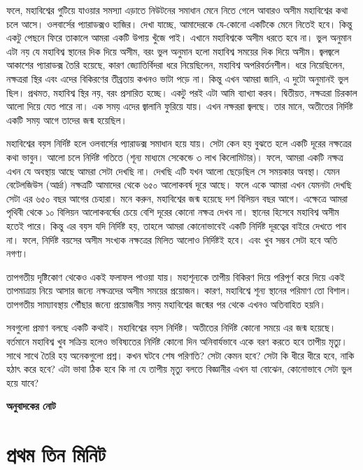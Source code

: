 \documentclass[
]{book}
\begin{document}
ফলে, মহাবিশ্বের গুটিয়ে যাওয়ার সমস্যা এড়াতে নিউটনের সমাধান মেনে নিতে গেলে আবারও অসীম মহাবিশ্বের কথা চলে আসে। ওলবার্সের প্যারাডক্সও হাজির। দেখা যাচ্ছে, আমাদেরকে যে-কোনো একটিকে মেনে নিতেই হবে। কিন্তু একটু পেছনে ফিরে তাকালে আমরা একটি উপায় খুঁজে পাই। এখানে মহাবিশ্বকে অসীম ধরতে হবে না। ভুল অনুমান এটা নয় যে মহাবিশ্ব স্থানের দিক দিয়ে অসীম, বরং ভুল অনুমান হলো মহাবিশ্ব সময়ের দিক দিয়ে অসীম। জ্বলজ্বলে আকাশের প্যারাডক্স তৈরি হয়েছে, কারণ জ্যোতির্বিদরা ধরে নিয়েছিলেন, মহাবিশ্ব অপরিবর্তনশীল। ধরে নিয়েছিলেন, নক্ষত্ররা স্থির এবং এদের বিকিরণের তীব্রতায় কখনও ভাটা পড়ে না। কিন্তু এখন আমরা জানি, এ দুটো অনুমানই ভুল ছিল। প্রথমত, মহাবিশ্ব স্থির নয়, বরং প্রসারিত হচ্ছে। একটু পরই এটা আমি ব্যাখ্যা করব। দ্বিতীয়ত, নক্ষত্ররা চিরকাল আলো দিয়ে যেত পারে না। এক সময় এদের জ্বালানি ফুরিয়ে যায়। এখন নক্ষররা জ্বলছে। তার মানে, অতীতের নির্দিষ্ট একটি সময় আগে তাদের জন্ম হয়েছিল।

মহাবিশ্বের বয়স নির্দিষ্ট হলে ওলবার্সের প্যারাডক্স সমাধান হয়ে যায়। সেটা কেন হয় বুঝতে হলে একটি দূরের নক্ষত্রের কথা ভাবুন। আলো চলে নির্দিষ্ট গতিতে (শূন্য মাধ্যমে সেকেন্ডে ৩ লাখ কিলোমিটার)। ফলে, আমরা একটি নক্ষত্র এখন যে অবস্থায় আছে আমরা সেটা দেখছি না। দেখছি এটি যখন আলো ছেড়েছিল সে সময়কার অবস্থা। যেমন বেটেলজিউস (আর্দ্রা) নক্ষত্রটি আমাদের থেকে ৬৫০ আলোকবর্ষ দূরে আছে। ফলে একে আমরা এখন যেমনটা দেখছি সেটা এর ৬৫০ বছর আগের চেহারা। মনে করুন, মহাবিশ্বের জন্ম হয়েছে দশ বিলিয়ন বছর আগে। এক্ষেত্রে আমরা পৃথিবী থেকে ১০ বিলিয়ন আলোকবর্ষের চেয়ে বেশি দূরের কোনো নক্ষত্র দেখব না। স্থানের হিসেবে মহাবিশ্ব অসীম হতেই পারে। কিন্তু এর বয়স যদি নির্দিষ্ট হয়, তাহলে আমরা কোনোভাবেই একটি নির্দিষ্ট দূরত্বের বাইরে দেখতে পাব না। ফলে, নির্দিষ্ট বয়সের অসীম সংখ্যক নক্ষত্রের মিলিত আলোও নির্দিষ্টই হবে। এবং খুব সম্ভব সেটা হবে অতি নগণ্য।

তাপগতীয় দৃষ্টিকোণ থেকেও একই ফলাফল পাওয়া যায়। মহাশূন্যকে তাপীয় বিকিরণ দিয়ে পরিপূর্ণ করে দিয়ে একই তাপমাত্রায় নিয়ে আসার জন্যে নক্ষত্রদের অসীম সময়ের প্রয়োজন। কারণ, মহাবিশ্বে শূন্য স্থানের পরিমাণ তো বিশাল। তাপগতীয় সাম্যাবস্থায় পৌঁছার জন্যে প্রয়োজনীয় সময় মহাবিশ্বের জন্মের পর থেকে এখনও অতিবাহিত হয়নি।

সবগুলো প্রমাণ বলছে একটি কথাই। মহাবিশ্বের বয়স নির্দিষ্ট। অতীতের নির্দিষ্ট কোনো সময়ে এর জন্ম হয়েছে। বর্তমানে মহাবিশ্ব খুব সক্রিয় হলেও ভবিষ্যতের নির্দিষ্ট কোনো দিন অনিবার্যভাবে একে বরণ করতে হবে তাপীয় মৃত্যু। সাথে সাথে তৈরি হয় অনেকগুলো প্রশ্ন। কখন ঘটবে শেষ পরিণতি? সেটা কেমন হবে? সেটা কি ধীরে ধীরে হবে, নাকি হঠাৎ করে হবে? এটা ভাবা ঠিক হবে কি না যে তাপীয় মৃত্যু বলতে বিজ্ঞানীর এখন যা বোঝেন, কোনোভাবে সেটা ভুল হয়ে যাবে?

\textbf{অনুবাদকের নোট}

\hypertarget{f3m}{%
\section{প্রথম তিন মিনিট}\label{f3m}}
\end{document}
